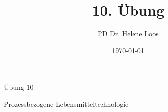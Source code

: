 \documentclass[aspectratio=169,9pt]{beamer}
\title{10. Übung}
\author{PD Dr. Helene Loos}
\date{\today}
\begin{document}
\small



\begin{frame}
\begin{center}

\LARGE Übung 10  \par \normalsize
Prozessbezogene Lebensmitteltechnologie
\end{center}
\small
\end{frame}
\end{document}
